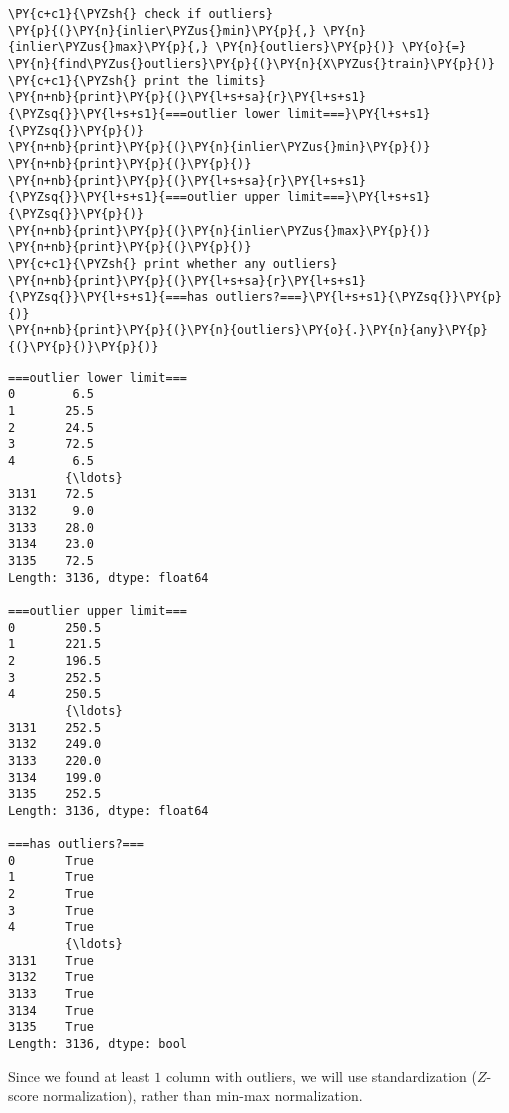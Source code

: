     \begin{tcolorbox}[breakable, size=fbox, boxrule=1pt, pad at break*=1mm,colback=cellbackground, colframe=cellborder]
\begin{Verbatim}[commandchars=\\\{\}]
\PY{c+c1}{\PYZsh{} check if outliers}
\PY{p}{(}\PY{n}{inlier\PYZus{}min}\PY{p}{,} \PY{n}{inlier\PYZus{}max}\PY{p}{,} \PY{n}{outliers}\PY{p}{)} \PY{o}{=} \PY{n}{find\PYZus{}outliers}\PY{p}{(}\PY{n}{X\PYZus{}train}\PY{p}{)}
\PY{c+c1}{\PYZsh{} print the limits}
\PY{n+nb}{print}\PY{p}{(}\PY{l+s+sa}{r}\PY{l+s+s1}{\PYZsq{}}\PY{l+s+s1}{===outlier lower limit===}\PY{l+s+s1}{\PYZsq{}}\PY{p}{)}
\PY{n+nb}{print}\PY{p}{(}\PY{n}{inlier\PYZus{}min}\PY{p}{)}
\PY{n+nb}{print}\PY{p}{(}\PY{p}{)}
\PY{n+nb}{print}\PY{p}{(}\PY{l+s+sa}{r}\PY{l+s+s1}{\PYZsq{}}\PY{l+s+s1}{===outlier upper limit===}\PY{l+s+s1}{\PYZsq{}}\PY{p}{)}
\PY{n+nb}{print}\PY{p}{(}\PY{n}{inlier\PYZus{}max}\PY{p}{)}
\PY{n+nb}{print}\PY{p}{(}\PY{p}{)}
\PY{c+c1}{\PYZsh{} print whether any outliers}
\PY{n+nb}{print}\PY{p}{(}\PY{l+s+sa}{r}\PY{l+s+s1}{\PYZsq{}}\PY{l+s+s1}{===has outliers?===}\PY{l+s+s1}{\PYZsq{}}\PY{p}{)}
\PY{n+nb}{print}\PY{p}{(}\PY{n}{outliers}\PY{o}{.}\PY{n}{any}\PY{p}{(}\PY{p}{)}\PY{p}{)}
\end{Verbatim}
\end{tcolorbox}

    \begin{Verbatim}[commandchars=\\\{\}]
===outlier lower limit===
0        6.5
1       25.5
2       24.5
3       72.5
4        6.5
        {\ldots}
3131    72.5
3132     9.0
3133    28.0
3134    23.0
3135    72.5
Length: 3136, dtype: float64

===outlier upper limit===
0       250.5
1       221.5
2       196.5
3       252.5
4       250.5
        {\ldots}
3131    252.5
3132    249.0
3133    220.0
3134    199.0
3135    252.5
Length: 3136, dtype: float64

===has outliers?===
0       True
1       True
2       True
3       True
4       True
        {\ldots}
3131    True
3132    True
3133    True
3134    True
3135    True
Length: 3136, dtype: bool
    \end{Verbatim}

    Since we found at least \(1\) column with outliers, we will use
standardization (\(Z\)-score normalization), rather than min-max
normalization.

